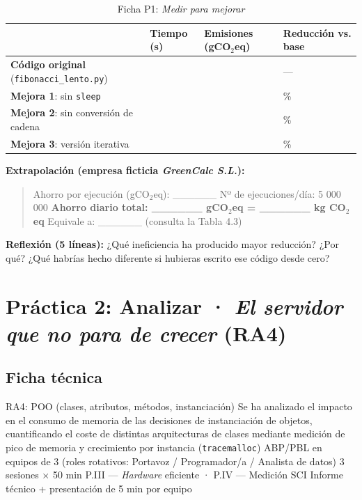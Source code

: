 \begin{table}[H]
\centering
\caption{Ficha P1: \textit{Medir para mejorar}}
\label{tab:ficha-p1-medir-para-mejorar}

\begin{tabularx}{\textwidth}{|X|X|X|X|}
\hline
\textbf{} & \textbf{Tiempo (s)} & \textbf{Emisiones (gCO$_2$eq)} & \textbf{Reducción vs. base} \\
\hline
\textbf{Código original} (\texttt{fibonacci\_lento.py}) &  &  & — \\
\hline
\textbf{Mejora 1}: sin \texttt{sleep} &  &  & \% \\
\hline
\textbf{Mejora 2}: sin conversión de cadena &  &  & \% \\
\hline
\textbf{Mejora 3}: versión iterativa &  &  & \% \\
\hline
\end{tabularx}

\end{table}


\textbf{Extrapolación (empresa ficticia \textit{GreenCalc S.L.}):}


\begin{quote}
Ahorro por ejecución (gCO$_2$eq): \_\_\_\_\_\_ Nº de ejecuciones/día: 5 000 000 \textbf{Ahorro diario total: \_\_\_\_\_\_ gCO$_2$eq = \_\_\_\_\_\_ kg CO$_2$eq} Equivale a: \_\_\_\_\_\_ (consulta la Tabla 4.3)
\end{quote}


\textbf{Reflexión (5 líneas):} ¿Qué ineficiencia ha producido mayor reducción? ¿Por qué? ¿Qué habrías hecho diferente si hubieras escrito ese código desde cero?






\section{Práctica 2: Analizar · \textit{El servidor que no para de crecer} (RA4)}


\subsection{Ficha técnica}


  {RA4: POO (clases, atributos, métodos, instanciación)}
  {Se ha analizado el impacto en el consumo de memoria de las decisiones de instanciación de objetos, cuantificando el coste de distintas arquitecturas de clases mediante medición de pico de memoria y crecimiento por instancia (\texttt{tracemalloc})}
  {ABP/PBL en equipos de 3 (roles rotativos: Portavoz / Programador/a / Analista de datos)}
  {3 sesiones $\times$ 50 min}
  {P.III — \textit{Hardware} eficiente · P.IV — Medición SCI}
  {Informe técnico + presentación de 5 min por equipo}



